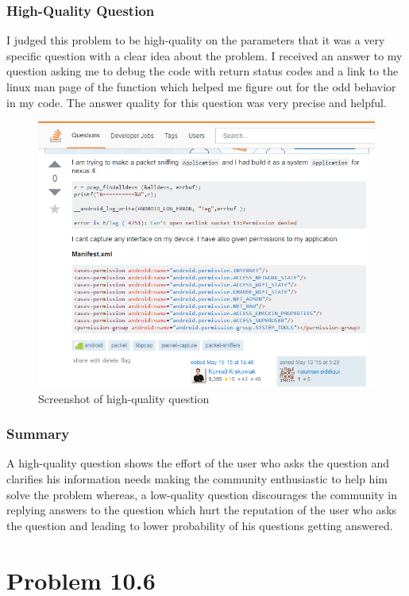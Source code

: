 \documentclass[12pt]{report}
\begin{document}
\subsection{High-Quality Question}
I judged this problem to be high-quality on the parameters that it was a very specific question with a clear idea about the problem. I received an answer to my question asking me to debug the code with return status codes and a link to the linux man page of the function which helped me figure out for the odd behavior in my code. The answer quality for this question was very precise and helpful.   
\begin{figure}[ht]
  \centering
  \includegraphics[width=1\textwidth]{Problem10_5/HighQuality.png}
  \caption{Screenshot of high-quality question}
  \label{fig:1}
\end{figure} 

\subsection{Summary}
A high-quality question shows the effort of the user who asks the question and clarifies his information needs making the community enthusiastic to help him solve the problem whereas, a low-quality question discourages the community in replying answers to the question which hurt the reputation of the user who asks the question and leading to lower probability of his questions getting answered. 

\chapter{Problem 10.6}
\end{document}
